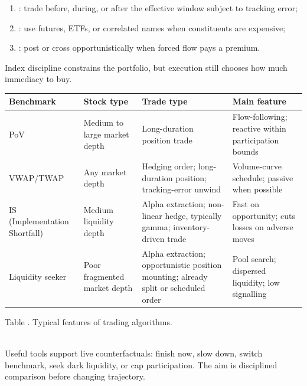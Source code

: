 \begin{taxonomy} 
\begin{enumerate}[label=\roman*.]
\setlength{\itemsep}{0pt}
\item {}: trade before, during, or after the effective window subject to tracking error;
\item {}: use futures, ETFs, or correlated names when constituents are expensive;
\item {}: post or cross opportunistically when forced flow pays a premium.
\end{enumerate}
Index discipline constrains the portfolio, but execution still chooses how much immediacy to buy.
\end{taxonomy}

\begin{table}[htbp]
\centering
\scriptsize
{}
\renewcommand{\arraystretch}{1.14}
\setlength{\tabcolsep}{4pt}
\begin{tabularx}{\textwidth}{@{}>{\RaggedRight\arraybackslash}p{} >{\RaggedRight\arraybackslash}p{} >{\RaggedRight\arraybackslash}p{} >{\RaggedRight\arraybackslash}X@{}}
\hline
\textbf{Benchmark} & \textbf{Stock type} & \textbf{Trade type} & \textbf{Main feature} \\
\hline
PoV & Medium to large market depth & Long-duration position trade & Flow-following; reactive within participation bounds \\
VWAP/TWAP & Any market depth & Hedging order; long-duration position; tracking-error unwind & Volume-curve schedule; passive when possible \\
IS (Implementation Shortfall) & Medium liquidity depth & Alpha extraction; non-linear hedge, typically gamma; inventory-driven trade & Fast on opportunity; cuts losses on adverse moves \\
Liquidity seeker & Poor fragmented market depth & Alpha extraction; opportunistic position mounting; already split or scheduled order & Pool search; dispersed liquidity; low signalling \\
\hline
\end{tabularx}

\vspace{0.25em}
{\footnotesize Table \thetable. Typical features of trading algorithms.}
\end{table}

\begin{practitionernote} \\
Useful tools support live counterfactuals: finish now, slow down, switch benchmark, seek dark liquidity, or cap participation. The aim is disciplined comparison before changing trajectory.
\end{practitionernote}
